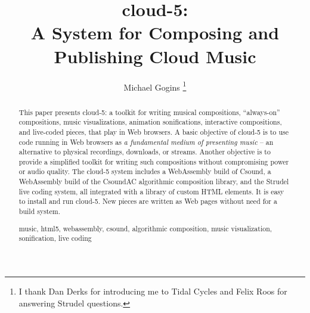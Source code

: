 \documentclass[runningheads,a4paper]{llncs}
\newcommand{\keywords}[1]{\par\addvspace\baselineskip
\noindent\keywordname\enspace\ignorespaces#1}
\begin{document}
\mainmatter  %

\title{cloud-5:\\A System for Composing and Publishing Cloud Music}




\author{Michael Gogins \thanks{I thank Dan Derks for introducing me to Tidal Cycles and Felix Roos for answering Strudel questions.}}
%


%
%

\maketitle
\begin{abstract}
This paper presents cloud-5: a toolkit for writing musical compositions, ``always-on'' compositions, music visualizations, animation sonifications, interactive compositions, and live-coded pieces, that play in Web browsers. A basic objective of cloud-5 is to use code running in Web browsers as \emph{a fundamental medium of presenting music} -- an alternative to physical recordings, downloads, or streams. Another objective is to provide a simplified toolkit for writing such compositions without compromising power or audio quality. The cloud-5 system includes a WebAssembly build of Csound, a WebAssembly build of the CsoundAC algorithmic composition library, and the Strudel live coding system, all integrated with a library of custom HTML elements. It is easy to install and run cloud-5. New pieces are written as Web pages without need for a build system.
 
\keywords{music, html5, webassembly, csound, algorithmic composition, music visualization, sonification, live coding}
\end{abstract}
\end{document}
